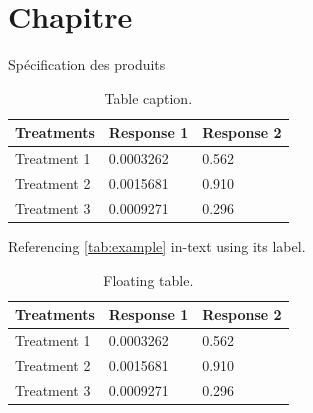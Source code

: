 \documentclass[
	11pt, %
	fleqn, %
	a4paper, %
]{LegrandOrangeBook}
\begin{document}

\chapterspaceabove{6.25cm} %
\chapterspacebelow{7.5cm} %


\chapter{Chapitre}

\begin{corollary}[S6.1]
Spécification des produits
\end{corollary}

\begin{table}[H] %
	\centering %
	\begin{tabular}{L{0.15\textwidth} R{0.15\textwidth} R{0.15\textwidth}} %
		\toprule
		\textbf{Treatments} & \textbf{Response 1} & \textbf{Response 2}\\
		\midrule
		Treatment 1 & 0.0003262 & 0.562 \\
		Treatment 2 & 0.0015681 & 0.910 \\
		Treatment 3 & 0.0009271 & 0.296 \\
		\bottomrule
	\end{tabular}
	\caption{Table caption.}
	\label{tab:example} %
\end{table}

Referencing \autoref{tab:example} in-text using its label.

\begin{table}[t] %
	\centering %
	\begin{tabular}{L{0.15\textwidth} R{0.15\textwidth} R{0.15\textwidth}} %
		\toprule
		\textbf{Treatments} & \textbf{Response 1} & \textbf{Response 2}\\
		\midrule
		Treatment 1 & 0.0003262 & 0.562 \\
		Treatment 2 & 0.0015681 & 0.910 \\
		Treatment 3 & 0.0009271 & 0.296 \\
		\bottomrule
	\end{tabular}
	\caption{Floating table.}
	\label{tab:floating} %
\end{table}
\end{document}
